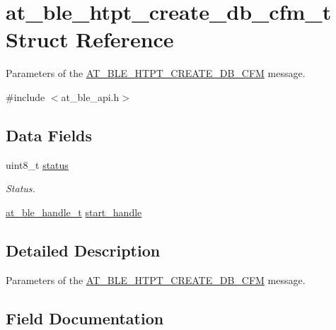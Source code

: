 \hypertarget{structat__ble__htpt__create__db__cfm__t}{}\section{at\+\_\+ble\+\_\+htpt\+\_\+create\+\_\+db\+\_\+cfm\+\_\+t Struct Reference}
\label{structat__ble__htpt__create__db__cfm__t}


Parameters of the \mbox{\hyperlink{at__ble__api_8h_a3324640b95f33169515f89738ed5baeba73960063c9b66cd270ef75968abddb59}{A\+T\+\_\+\+B\+L\+E\+\_\+\+H\+T\+P\+T\+\_\+\+C\+R\+E\+A\+T\+E\+\_\+\+D\+B\+\_\+\+C\+FM}} message.  




{\ttfamily \#include $<$at\+\_\+ble\+\_\+api.\+h$>$}

\subsection*{Data Fields}
\begin{DoxyCompactItemize}
\item 
uint8\+\_\+t \mbox{\hyperlink{structat__ble__htpt__create__db__cfm__t_ade818037fd6c985038ff29656089758d}{status}}
\begin{DoxyCompactList}\small\item\em Status. \end{DoxyCompactList}\item 
\mbox{\hyperlink{at__ble__api_8h_abd23646d0c662860741f787efc8456f2}{at\+\_\+ble\+\_\+handle\+\_\+t}} \mbox{\hyperlink{structat__ble__htpt__create__db__cfm__t_ac7742bb811cf20fa3215e3d2129b6b26}{start\+\_\+handle}}
\end{DoxyCompactItemize}


\subsection{Detailed Description}
Parameters of the \mbox{\hyperlink{at__ble__api_8h_a3324640b95f33169515f89738ed5baeba73960063c9b66cd270ef75968abddb59}{A\+T\+\_\+\+B\+L\+E\+\_\+\+H\+T\+P\+T\+\_\+\+C\+R\+E\+A\+T\+E\+\_\+\+D\+B\+\_\+\+C\+FM}} message. 

\subsection{Field Documentation}
\mbox{\label{structat__ble__htpt__create__db__cfm__t_ac7742bb811cf20fa3215e3d2129b6b26}} 

